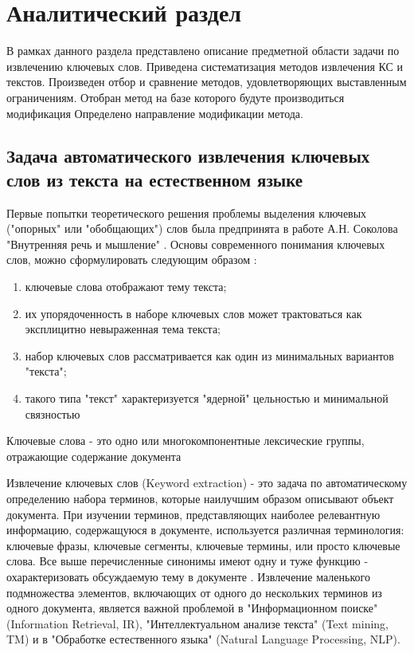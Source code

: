 \chapter{Аналитический раздел}
В рамках данного раздела представлено описание предметной области задачи по извлечению ключевых слов. 
Приведена систематизация методов извлечения КС и текстов.
Произведен отбор и сравнение методов, удовлетворяющих выставленным ограничениям.
Отобран метод на базе которого будуте производиться модификация
Определено направление модификации метода.

\section{Задача автоматического извлечения ключевых слов из текста на естественном языке}

Первые попытки теоретического решения проблемы выделения ключевых ("опорных" или "обобщающих") слов была предпринята в работе А.Н. Соколова "Внутренняя речь и мышление" \cite{6}.
Основы современного понимания ключевых слов, можно сформулировать следующим образом \cite{7}:
\begin{enumerate}
	\item ключевые слова отображают тему текста;
	\item их упорядоченность в наборе ключевых слов может трактоваться как эксплицитно невыраженная тема текста;
	\item набор ключевых слов рассматривается как один из минимальных вариантов "текста";
	\item такого типа "текст" характеризуется "ядерной" цельностью и минимальной связностью
\end{enumerate}

Ключевые слова - это одно или многокомпонентные лексические группы, отражающие содержание документа \cite{3}

Извлечение ключевых слов (Keyword extraction) - это задача по автоматическому определению набора терминов, которые наилучшим образом описывают объект документа.
При изучении терминов, представляющих наиболее релевантную информацию, содержащуюся в документе, используется различная терминология: ключевые фразы, ключевые сегменты, ключевые термины, или просто ключевые слова.
Все выше перечисленные синонимы имеют одну и туже функцию - охарактеризовать обсуждаемую тему в документе \cite{4}.
Извлечение маленького подмножества элементов, включающих от одного до нескольких терминов из одного документа, является важной проблемой в "Информационном поиске" (Information Retrieval, IR), "Интеллектуальном анализе текста" (Text mining, TM) и в "Обработке естественного языка" (Natural Language Processing, NLP).

